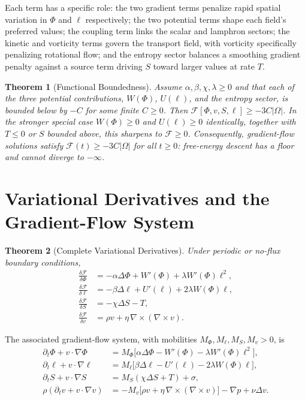 \documentclass[11pt,fleqn]{book}
\numberwithin{equation}{chapter}
\theoremstyle{plain}
\newtheorem{theorem}{Theorem}[chapter]
\theoremstyle{definition}
\theoremstyle{remark}
\begin{document}
Each term has a specific role: the two gradient terms penalize rapid spatial variation in \(\Phi\) and \(\ell\) respectively; the two potential terms shape each field's preferred values; the coupling term links the scalar and lamphron sectors; the kinetic and vorticity terms govern the transport field, with vorticity specifically penalizing rotational flow; and the entropy sector balances a smoothing gradient penalty against a source term driving \(S\) toward larger values at rate \(T\).

\begin{theorem}[Functional Boundedness]
Assume \(\alpha,\beta,\chi,\lambda\geq 0\) and that each of the three potential contributions, \(W(\Phi)\), \(U(\ell)\), and the entropy sector, is bounded below by \(-C\) for some finite \(C\geq 0\). Then \(\mathcal F[\Phi,v,S,\ell]\geq -3C|\Omega|\). In the stronger special case \(W(\Phi)\geq 0\) and \(U(\ell)\geq 0\) identically, together with \(T\leq 0\) or \(S\) bounded above, this sharpens to \(\mathcal F\geq 0\). Consequently, gradient-flow solutions satisfy \(\mathcal F(t)\geq -3C|\Omega|\) for all \(t\geq 0\): free-energy descent has a floor and cannot diverge to \(-\infty\).
\end{theorem}

\section{Variational Derivatives and the Gradient-Flow System}

\begin{theorem}[Complete Variational Derivatives]
Under periodic or no-flux boundary conditions,
\begin{align}
\frac{\delta\mathcal F}{\delta\Phi} &= -\alpha\Delta\Phi + W'(\Phi) + \lambda W'(\Phi)\ell^2, \\
\frac{\delta\mathcal F}{\delta\ell} &= -\beta\Delta\ell + U'(\ell) + 2\lambda W(\Phi)\ell, \\
\frac{\delta\mathcal F}{\delta S} &= -\chi\Delta S - T, \\
\frac{\delta\mathcal F}{\delta v} &= \rho v + \eta\,\nabla\times(\nabla\times v).
\end{align}
\end{theorem}

The associated gradient-flow system, with mobilities \(M_\Phi, M_\ell, M_S, M_v>0\), is
\begin{align}
\partial_t\Phi + v\cdot\nabla\Phi &= M_\Phi\bigl[\alpha\Delta\Phi - W'(\Phi) - \lambda W'(\Phi)\ell^2\bigr], \\
\partial_t\ell + v\cdot\nabla\ell &= M_\ell\bigl[\beta\Delta\ell - U'(\ell) - 2\lambda W(\Phi)\ell\bigr], \\
\partial_t S + v\cdot\nabla S &= M_S(\chi\Delta S + T) + \sigma, \\
\rho(\partial_t v + v\cdot\nabla v) &= -M_v\bigl[\rho v + \eta\,\nabla\times(\nabla\times v)\bigr] - \nabla p + \nu\Delta v.
\end{align}
\end{document}
